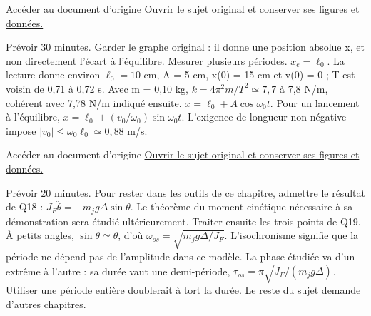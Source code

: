 \begin{loi}{Accéder au document d’origine}
\href{https://cahier-de-prepa.fr/mp*-condorcet/download?id=98&v=66f32}{Ouvrir le sujet original et conserver ses figures et données.}
\end{loi}
Prévoir 30 minutes. Garder le graphe original : il donne une position absolue x, et non directement l’écart à l’équilibre. Mesurer plusieurs périodes.
$x_e=\ell_0$. La lecture donne environ $\ell_0=10$ cm, A = 5 cm, x(0) = 15 cm et v(0) = 0 ; T est voisin de 0,71 à 0,72 s. Avec m = 0,10 kg, $k=4\pi^2m/T^2\simeq7{,}7$ à 7,8 N/m, cohérent avec 7,78 N/m indiqué ensuite. $x=\ell_0+A\cos\omega_0t$. Pour un lancement à l’équilibre, $x=\ell_0+(v_0/\omega_0)\sin\omega_0t$. L’exigence de longueur non négative impose $|v_0|\leq\omega_0\ell_0\simeq0{,}88$ m/s.

\begin{loi}{Accéder au document d’origine}
\href{https://www.concours-commun-inp.fr/_resource/annales\%20\%C3\%A9crits/2024/MP/2024_MP2PC.pdf?download=true}{Ouvrir le sujet original et conserver ses figures et données.}
\end{loi}
Prévoir 20 minutes. Pour rester dans les outils de ce chapitre, admettre le résultat de Q18 : $J_F\ddot\theta=-m_jg\Delta\sin\theta$. Le théorème du moment cinétique nécessaire à sa démonstration sera étudié ultérieurement. Traiter ensuite les trois points de Q19.
À petits angles, $\sin\theta\simeq\theta$, d’où $\omega_{os}=\sqrt{m_jg\Delta/J_F}$. L’isochronisme signifie que la période ne dépend pas de l’amplitude dans ce modèle. La phase étudiée va d’un extrême à l’autre : sa durée vaut une demi-période, $\tau_{os}=\pi\sqrt{J_F/(m_jg\Delta)}$. Utiliser une période entière doublerait à tort la durée. Le reste du sujet demande d’autres chapitres.

